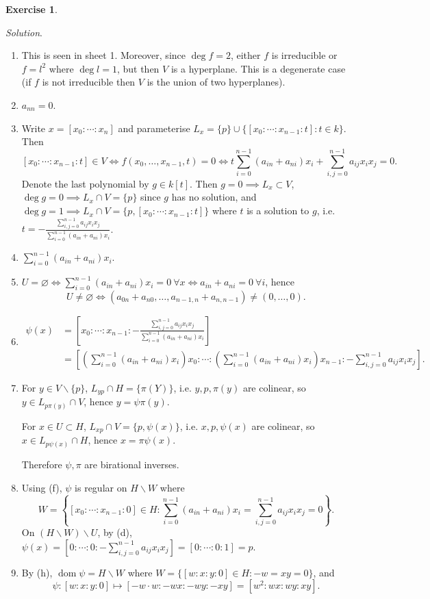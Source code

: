 \documentclass{article}
\newcommand{\dom}{\operatorname{dom}}
\theoremstyle{definition}
\newtheorem{exe}[defn]{Exercise}
\begin{document}
\begin{exe}
\begin{enumerate}
\textit{Solution}. \begin{enumerate}
\item This is seen in sheet 1. Moreover, since $\deg f=2$, either $f$ is irreducible or $f=l^2$ where $\deg l=1$, but then $V$ is a hyperplane. This is a degenerate case (if $f$ is not irreducible then $V$ is the union of two hyperplanes).
\item $a_{nn}=0$.
\item Write $x=[x_0:\cdots:x_n]$ and parameterise $L_x=\{p\}\cup\{[x_0:\cdots:x_{n-1}:t]:t\in k\}$. Then
\[
[x_0:\cdots:x_{n-1}:t]\in V\iff f(x_0,\ldots,x_{n-1},t)=0\iff t\sum_{i=0}^{n-1}(a_{in}+a_{ni})x_i+\sum_{i,j=0}^{n-1}a_{ij}x_ix_j=0.
\]
Denote the last polynomial by $g\in k[t]$. Then $g=0\implies L_x\subset V$, $\deg g=0\implies L_x\cap V=\{p\}$ since $g$ has no solution, and $\deg g=1\implies L_x\cap V=\{p,[x_0:\cdots:x_{n-1}:t]\}$ where $t$ is a solution to $g$, i.e. $t=-\frac{\sum_{i,j=0}^{n-1}a_{ij}x_ix_j}{\sum_{i=0}^{n-1}(a_{in}+a_{ni})x_i}$.
\item $\sum_{i=0}^{n-1}(a_{in}+a_{ni})x_i$.
\item $U=\varnothing\iff\sum_{i=0}^{n-1}(a_{in}+a_{ni})x_i=0 \ \forall x\iff a_{in}+a_{ni}=0 \ \forall i$, hence
\[
U\neq\varnothing\iff (a_{0n}+a_{n0},\ldots,a_{n-1,n}+a_{n,n-1})\neq (0,\ldots,0).
\]
\item \[
\begin{aligned}
\psi(x)&=\left[x_0:\cdots:x_{n-1}:-\frac{\sum_{i,j=0}^{n-1}a_{ij}x_ix_j}{\sum_{i=0}^{n-1}(a_{in}+a_{ni})x_i}\right]\\
&=\left[\left(\sum_{i=0}^{n-1}(a_{in}+a_{ni})x_i\right)x_0:\cdots:\left(\sum_{i=0}^{n-1}(a_{in}+a_{ni})x_i\right)x_{n-1}:-\sum_{i,j=0}^{n-1}a_{ij}x_ix_j \right].
\end{aligned}
\]
\item For $y\in V\backslash\{p\}$, $L_{yp}\cap H=\{\pi(Y)\}$, i.e. $y,p,\pi(y)$ are colinear, so $y\in L_{p\pi(y)}\cap V$, hence $y=\psi\pi(y)$.

For $x\in U\subset H$, $L_{xp}\cap V=\{p,\psi(x)\}$, i.e. $x,p,\psi(x)$ are colinear, so $x\in L_{p\psi(x)}\cap H$, hence $x=\pi\psi(x)$.

Therefore $\psi,\pi$ are birational inverses.
\item Using (f), $\psi$ is regular on $H\backslash W$ where
\[
W=\left\{[x_0:\cdots:x_{n-1}:0]\in H:\sum_{i=0}^{n-1}(a_{in}+a_{ni})x_i=\sum_{i,j=0}^{n-1}a_{ij}x_ix_j=0\right\}.
\]
On $(H\backslash W)\backslash U$, by (d), $\psi(x)=\left[0:\cdots:0:-\sum_{i,j=0}^{n-1}a_{ij}x_ix_j\right]=[0:\cdots:0:1]=p$.
\item By (h), $\dom\psi=H\backslash W$ where $W=\{[w:x:y:0]\in H:-w=xy=0\}$, and
\[
\psi:[w:x:y:0]\mapsto [-w\cdot w:-wx:-wy:-xy]=[w^2:wx:wy:xy].
\]


\end{enumerate}
\end{enumerate}
\end{exe}
\end{document}
